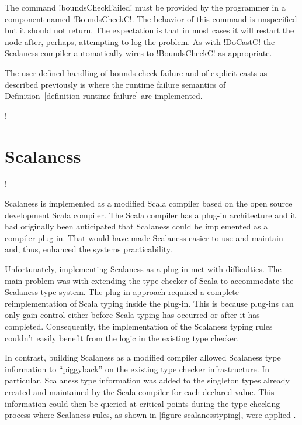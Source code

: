 The command !boundsCheckFailed! must be provided by the programmer in a component named
!BoundsCheckC!. The behavior of this command is unspecified but it should not return. The expectation is that
in most cases it will restart the node after, perhaps, attempting to log the problem. As with
!DoCastC! the Scalaness compiler automatically wires to !BoundsCheckC! as appropriate.

The user defined handling of bounds check failure and of explicit casts as described previously
is where the runtime failure semantics of Definition~\ref{definition-runtime-failure} are
implemented.

\lstDeleteShortInline!

\section{Scalaness}
\label{section-scalaness-implementation}

\lstset{language=scalaness}
\lstMakeShortInline!

Scalaness is implemented as a modified Scala compiler \cite{scalaness-home} based on the open
source development Scala compiler. The Scala compiler has a plug-in architecture and it had
originally been anticipated that Scalaness could be implemented as a compiler plug-in. That
would have made Scalaness easier to use and maintain and, thus, enhanced the systems
practicability.

Unfortunately, implementing Scalaness as a plug-in met with difficulties. The main problem was
with extending the type checker of Scala to accommodate the Scalaness type system. The plug-in
approach required a complete reimplementation of Scala typing inside the plug-in. This is
because plug-ins can only gain control either before Scala typing has occurred or after it has
completed. Consequently, the implementation of the Scalaness typing rules couldn't easily
benefit from the logic in the existing type checker.

In contrast, building Scalaness as a modified compiler allowed Scalaness type information to
``piggyback'' on the existing type checker infrastructure. In particular, Scalaness type
information was added to the singleton types already created and maintained by the Scala
compiler for each declared value. This information could then be queried at critical points
during the type checking process where Scalaness rules, as shown in
\autoref{figure-scalanesstyping}, were applied \cite{watson-masters-2013}.

